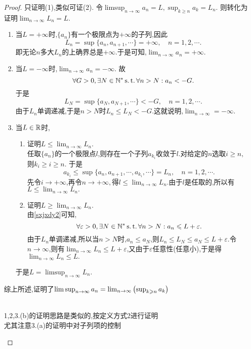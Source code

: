 \begin{proof}%
    只证明(1),类似可证(2).
    令$\limsup_{n\to\infty}a_n=L,\sup_{k\geqslant n}a_k=L_n.$
    则转化为证明$\lim_{n\to\infty}L_n=L.$
    \begin{enumerate}
        \item 当$L=+\infty$时,$\{a_n\}$有一个极限点为$+\infty$的子列,因此\[L_n=\sup\{a_n,a_{n+1},\cdots\}=+\infty,\quad n=1,2,\cdots.\]
        即无论$n$多大$L_n$的上确界总是$+\infty$.于是可知,$\lim_{n\to\infty}a_n=+\infty.$
        \item 当$L=-\infty$时,$\lim_{n\to\infty}a_n=-\infty.$
        故\[\forall G>0,\exists N\in\mathbb{N}^*\operatorname{s.t.}\forall n>N:a_n<-G.\]
        于是\[L_N=\sup\{a_{N},a_{N+1},\cdots\}<-G,\quad n=1,2,\cdots.\]
        由于$L_n$单调递减,于是$n>N$时$L_n\leqslant L_{N}<-G.$这就说明,$\lim_{n\to\infty}=-\infty.$
        \item 当$L\in \mathbb{R}$时,
        \begin{enumerate}
            \item 证明$L\leqslant\lim_{n\to\infty}L_n.$\\
            任取$\{a_n\}$的一个极限点$l$,则存在一个子列$a_{k_i}$收敛于$l$.对给定的$n$选取$i\geqslant n,$则$k_i\geqslant i\geqslant n$.
            于是\[a_{k_i}\leqslant\sup\{a_n,a_{n+1},\cdots,a_{k_i},\cdots\}=L_n,\quad n=1,2,\cdots.\]
            先令$i\to +\infty$,再令$n\to +\infty,$得$l\leqslant\lim_{n\to\infty}L_n$.由于$l$是任取的,所以有$L\leqslant\lim_{n\to\infty}L_n.$
            \item 证明$L\geqslant\lim_{n\to\infty}L_n.$\\
            由\ref{sxjxdy2}可知,
            \[\forall \varepsilon >0,\exists N\in\mathbb{N}^*\operatorname{s.t.}\forall n>N:a_n\leqslant L+\varepsilon.\]
            由于$L_n$单调递减,所以当$n>N$时,$a_n\leqslant a_N$,则$L_n\leqslant L_N\leqslant a_N\leqslant L+\varepsilon.$令$n\to\infty$,则有$\lim_{n\to\infty}L_n\leqslant L+\varepsilon$,又由于$\varepsilon$任意性(任意小),于是得$\lim_{n\to\infty}L_n\leqslant L.$
        \end{enumerate}
        于是$L=\limsup_{n\to\infty}L_n.$
    \end{enumerate}
    综上所述,证明了$\limsup_{n\to\infty}a_n=\lim_{n\to\infty}\left(\sup_{k\geqslant n}a_k\right)$
    \begin{note}\\
        1,2,3.(b)的证明思路是类似的,按定义方式2进行证明\\
        尤其注意3.(a)的证明中对子列项的控制
    \end{note}
\end{proof}


